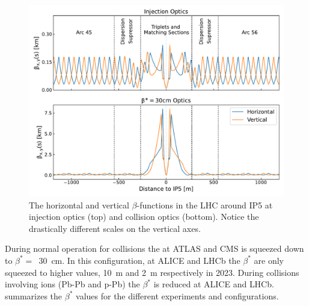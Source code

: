 \begin{figure}[!hbt]
  \centering
  \includegraphics*[width=\linewidth]{Figures/Optics_Measurements_Corrections_at_LHC/ir5_surroundings_optics.pdf}
  \caption{The horizontal and vertical \(\beta\)-functions in the LHC around IP5 at injection optics (top) and collision optics (bottom). Notice the drastically different scales on the vertical axes.}
  \label{figure:ir5_and_around}
\end{figure}

During normal operation for collisions the  at \acrshort{ATLAS} and \acrshort{CMS} is squeezed down to \(\beta^{\ast} =\)~\qty{30}{\centi\metre}.
In this configuration, at \acrshort{ALICE} and \acrshort{LHCb} the \(\beta^{\ast}\) are only squeezed to higher values, \qty{10}{\meter} and \qty{2}{\meter} respectively in \num{2023}.
During collisions involving ions (Pb-Pb and p-Pb) the \(\beta^{\ast}\) is reduced at \acrshort{ALICE} and \acrshort{LHCb}.
 summarizes the \(\beta^{\ast}\) values for the different experiments and configurations.

